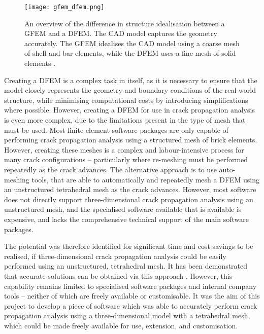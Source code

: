 \begin{figure}[H]
	\centering
	\texttt{[image: gfem\_dfem.png]}
	\caption{An overview of the difference in structure idealisation between a GFEM and a DFEM. The CAD model captures the geometry accurately. The GFEM idealises the CAD model using a coarse mesh of shell and bar elements, while the DFEM uses a fine mesh of solid elements \cite{wasserman_altair_2016}.}
	\label{fig:gfem_dfem}
\end{figure}

\newpage
Creating a DFEM is a complex task in itself, as it is necessary to ensure that the model closely represents the geometry and boundary conditions of the real-world structure, while minimising computational costs by introducing simplifications where possible. However, creating a DFEM for use in crack propagation analysis is even more complex, due to the limitations present in the type of mesh that must be used. Most finite element software packages are only capable of performing crack propagation analysis using a structured mesh of brick elements. However, creating these meshes is a complex and labour-intensive process for many crack configurations -- particularly where re-meshing must be performed repeatedly as the crack advances. The alternative approach is to use auto-meshing tools, that are able to automatically and repeatedly mesh a DFEM using an unstructured tetrahedral mesh as the crack advances. However, most software does not directly support three-dimensional crack propagation analysis using an unstructured mesh, and the specialised software available that is available is expensive, and lacks the comprehensive technical support of the main software packages.

The potential was therefore identified for significant time and cost savings to be realised, if three-dimensional crack propagation analysis could be easily performed using an unstructured, tetrahedral mesh. It has been demonstrated that accurate solutions can be obtained via this approach \cite{nejati_disk-shaped_2015} \cite{koshima_three-dimensional_2015} \cite{tabaza_new_2021}. However, this capability remains limited to specialised software packages and internal company tools -- neither of which are freely available or customisable. It was the aim of this project to develop a piece of software which was able to accurately perform crack propagation analysis using a three-dimensional model with a tetrahedral mesh, which could be made freely available for use, extension, and customisation.


